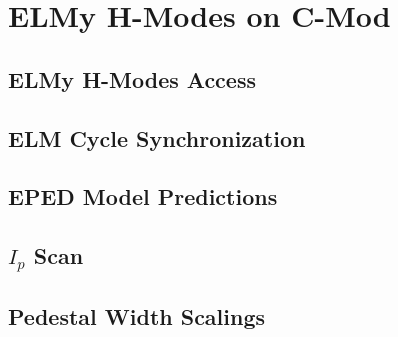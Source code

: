 \chapter{ELMy H-Modes on C-Mod}\label{ch:Elmy}

\section{ELMy H-Modes Access}\label{sec:elmy_access}

\nicesectionending

\section{ELM Cycle Synchronization}\label{sec:elmy_sync}

\nicesectionending

\section{EPED Model Predictions}\label{sec:elmy_eped}

\nicesectionending

\section{$I_p$ Scan}\label{sec:elmy_ip}

\nicesectionending

\section{Pedestal Width Scalings}\label{sec:elmy_width}

\nicechapterending


